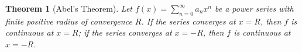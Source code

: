 \documentclass[12pt, lettersize]{book}
\theoremstyle{plain}
\newtheorem{thm}{Theorem}[section]
\newtheorem{lem}[thm]{Lemma}
\theoremstyle{definition}
\theoremstyle{remark}
\begin{document}
		\setcounter{equation}{0}
		\begin{thm}[Abel's Theorem]\label{thm:26.6}
			Let $f(x)=\sum_{n=0}^{\infty}a_nx^n$ be a power series with finite positive radius of convergence $R$. If the series converges at $x=R$, then $f$ is continuous at $x=R$; if the series converges at $x=-R$, then $f$ is continuous at $x=-R$.
		\end{thm}
		
		\newpage
		
		\begin{comment}
		\section{Differentiation and Integration of Power Series}
		\begin{lem}\label{lem:26.3}
		If the power series $\sum_{n=0}^{\infty}a_nx^n$ has radius of convergence $R$, then the power series
		\begin{displaymath}
		\sum_{n=1}^{\infty}na_nx^{n-1}\quad\text{and}\quad\sum_{n=0}^{\infty}\frac{a_n}{n+1}x^{n+1}
		\end{displaymath} 
		also have radius of convergence $R$.
		\end{lem}
		\begin{proof}
		First observe the series $\sum na_nx^{n-1}$ and $\sum na_nx^n$ have the same radius of convergence. Same for $\sum\frac{a_n}{n+1}x^{n+1}$ and $\sum\frac{a_n}{n+1}x^n$. It is because one is $x$ multiple of the other.
		
		For the series $\sum na_nx^n$, because $\lim\sup(n|a_n|)^{1/n}=\lim\sup n^{1/n}|a_n|^{1/n}$ and $\lim n^{1/n}=1$, so $\lim\sup(n|a_n|)^{1/n}=\lim\sup|a_n|^{1/n}=\beta$. Hence $\sum na_nx^n$ has radius of convergence $R$.
		
		Similarly, for the series $\sum\frac{a_n}{n+1}x^n$, because $\lim\sup(\frac{|a_n|}{n+1})^{1/n}=\lim\sup(\frac{1}{n+1})^{1/n}\cdots|a_n|^{1/n}=1\cdot\lim\sup|a_n|^{1/n}=\beta$ by \ref{thm:12.1}, so the series $\sum\frac{a_n}{n+1}x^n$ has radius of convergence $R$.
		\end{proof}
		

\end{comment}
\end{document}
